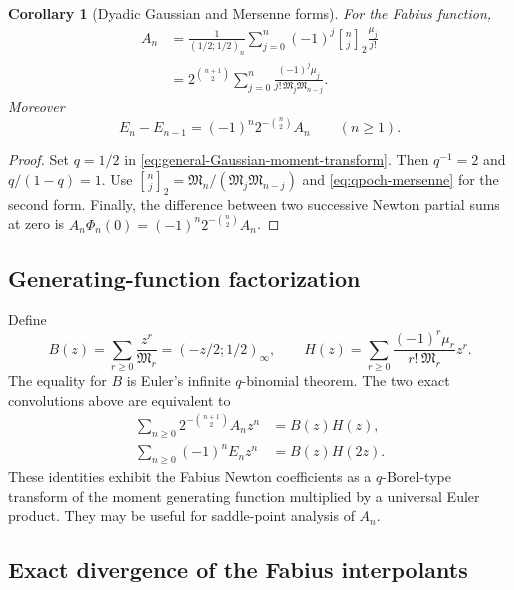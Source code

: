 \documentclass[11pt,a4paper,oneside]{article}
\newtheorem{corollary}[corollary]{Corollary}
\theoremstyle{definition}
\theoremstyle{remark}
\newcommand{\qbinom}[3]{\genfrac{[}{]}{0pt}{}{#1}{#2}_{#3}}
\begin{document}
\begin{corollary}[Dyadic Gaussian and Mersenne forms]
\label{cor:dyadic-moment-transform}
For the Fabius function,
\begin{align}
 A_n
 &=\frac1{(1/2;1/2)_n}
 \sum_{j=0}^n(-1)^j\qbinom nj2\frac{\mu_j}{j!}
 \label{eq:fabius-Gaussian-transform}\\
 &=2^{\binom{n+1}{2}}
 \sum_{j=0}^n
 \frac{(-1)^j\mu_j}
 {j!\,\mathfrak M_j\mathfrak M_{n-j}}.
 \label{eq:fabius-Mersenne-transform}
\end{align}
Moreover
\begin{equation}
 E_n-E_{n-1}=(-1)^n2^{-\binom n2}A_n
 \qquad(n\ge1).
 \label{eq:endpoint-increment}
\end{equation}
\end{corollary}

\begin{proof}
Set $q=1/2$ in \eqref{eq:general-Gaussian-moment-transform}.  Then
$q^{-1}=2$ and $q/(1-q)=1$.  Use
\(
 \qbinom nj2=\mathfrak M_n/(\mathfrak M_j\mathfrak M_{n-j})
\)
and \eqref{eq:qpoch-mersenne} for the second form.  Finally, the difference
between two successive Newton partial sums at zero is
$A_n\Phi_n(0)=(-1)^n2^{-\binom n2}A_n$.
\end{proof}

\subsection{Generating-function factorization}

Define
\begin{equation}
 B(z)=\sum_{r\ge0}\frac{z^r}{\mathfrak M_r}
 =(-z/2;1/2)_\infty,
 \qquad
 H(z)=\sum_{r\ge0}\frac{(-1)^r\mu_r}{r!\,\mathfrak M_r}z^r.
 \label{eq:BH-generating}
\end{equation}
The equality for $B$ is Euler's infinite $q$-binomial theorem.  The two exact
convolutions above are equivalent to
\begin{align}
 \sum_{n\ge0}2^{-\binom{n+1}{2}}A_nz^n
 &=B(z)H(z),
 \label{eq:newton-generating-factorization}\\
 \sum_{n\ge0}(-1)^nE_nz^n
 &=B(z)H(2z).
 \label{eq:endpoint-generating-factorization}
\end{align}
These identities exhibit the Fabius Newton coefficients as a $q$-Borel-type
transform of the moment generating function multiplied by a universal Euler
product.  They may be useful for saddle-point analysis of $A_n$.

\subsection{Exact divergence of the Fabius interpolants}
\end{document}
